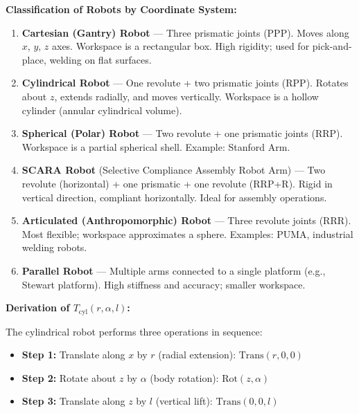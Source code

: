\documentclass[12pt,a3paper]{article}
\begin{document}
\begin{enumerate}
\begin{tcolorbox}[enhanced,breakable,ansbox,colback=cC!4,colframe=cC,
  boxrule=0.8pt,arc=5pt,
  title={\textbf{Answer}},fonttitle=\bfseries\color{white},colbacktitle=cC]
\textbf{Classification of Robots by Coordinate System:}

\begin{enumerate}[leftmargin=*,label=\textbf{\arabic*.}]
  \item \textbf{Cartesian (Gantry) Robot} — Three prismatic joints (PPP).
    Moves along $x$, $y$, $z$ axes. Workspace is a rectangular box.
    High rigidity; used for pick-and-place, welding on flat surfaces.

  \item \textbf{Cylindrical Robot} — One revolute + two prismatic joints
    (RPP). Rotates about $z$, extends radially, and moves vertically.
    Workspace is a hollow cylinder (annular cylindrical volume).

  \item \textbf{Spherical (Polar) Robot} — Two revolute + one prismatic
    joints (RRP). Workspace is a partial spherical shell. Example:
    Stanford Arm.

  \item \textbf{SCARA Robot} (Selective Compliance Assembly Robot Arm)
    — Two revolute (horizontal) + one prismatic + one revolute (RRP+R).
    Rigid in vertical direction, compliant horizontally. Ideal for
    assembly operations.

  \item \textbf{Articulated (Anthropomorphic) Robot} — Three revolute
    joints (RRR). Most flexible; workspace approximates a sphere.
    Examples: PUMA, industrial welding robots.

  \item \textbf{Parallel Robot} — Multiple arms connected to a single
    platform (e.g., Stewart platform). High stiffness and accuracy;
    smaller workspace.
\end{enumerate}

\medskip
\textbf{Derivation of $T_{\mathrm{cyl}}(r,\alpha,l)$:}

The cylindrical robot performs three operations in sequence:
\begin{itemize}[leftmargin=1.5em,itemsep=2pt]
  \item \textbf{Step 1:} Translate along $x$ by $r$ (radial
    extension): $\mathrm{Trans}(r,0,0)$
  \item \textbf{Step 2:} Rotate about $z$ by $\alpha$ (body rotation):
    $\mathrm{Rot}(z,\alpha)$
  \item \textbf{Step 3:} Translate along $z$ by $l$ (vertical lift):
    $\mathrm{Trans}(0,0,l)$
\end{itemize}


\end{tcolorbox}
\end{enumerate}
\end{document}

